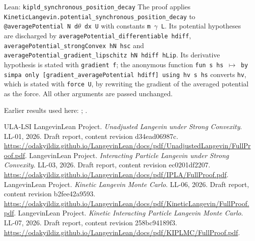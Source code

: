 \documentclass[11pt,a4paper]{article}
\begin{document}
\begin{leanbox}{Lean: \texttt{kipld\_\allowbreak{}synchronous\_\allowbreak{}position\_\allowbreak{}decay}}
The proof applies \texttt{Kinetic\allowbreak{}Langevin.\allowbreak{}potential\_\allowbreak{}synchronous\_\allowbreak{}position\_\allowbreak{}decay} to \texttt{@average\allowbreak{}Potential N d\ensuremath{\theta} dx U} with constants \texttt{m \ensuremath{\gamma} L}. Its potential hypotheses are discharged by \texttt{average\allowbreak{}Potential\_\allowbreak{}differentiable hdiff}, \texttt{average\allowbreak{}Potential\_\allowbreak{}strong\allowbreak{}Convex h\allowbreak{}N hsc} and \texttt{average\allowbreak{}Potential\_\allowbreak{}gradient\_\allowbreak{}lipschitz h\allowbreak{}N hdiff h\allowbreak{}Lip}. Its derivative hypothesis is stated with \texttt{gradient f}; the anonymous function \texttt{fun s hs \ensuremath{\mapsto} by simpa only [gradient\_\allowbreak{}average\allowbreak{}Potential hdiff] using hv s hs} converts \texttt{hv}, which is stated with \texttt{force U}, by rewriting the gradient of the averaged potential as the force. All other arguments are passed unchanged.
\end{leanbox}


Earlier results used here: \cite[Section~3.1.1]{LangevinLean2026IPLA}; \cite[Section~3.6.5]{LangevinLean2026Kinetic}.

\begin{thebibliography}{ULA-LSI}
LangevinLean Project. \emph{Unadjusted Langevin under Strong Convexity}. LL-01, 2026. Draft report, content revision d34ead06987c. \url{https://odakyildiz.github.io/LangevinLean/docs/pdf/UnadjustedLangevin/FullProof.pdf}.
LangevinLean Project. \emph{Interacting Particle Langevin under Strong Convexity}. LL-03, 2026. Draft report, content revision ec0201df2207. \url{https://odakyildiz.github.io/LangevinLean/docs/pdf/IPLA/FullProof.pdf}.
LangevinLean Project. \emph{Kinetic Langevin Monte Carlo}. LL-06, 2026. Draft report, content revision b2fee42a9593. \url{https://odakyildiz.github.io/LangevinLean/docs/pdf/KineticLangevin/FullProof.pdf}.
LangevinLean Project. \emph{Kinetic Interacting Particle Langevin Monte Carlo}. LL-07, 2026. Draft report, content revision 258bc94189f3. \url{https://odakyildiz.github.io/LangevinLean/docs/pdf/KIPLMC/FullProof.pdf}.
\end{thebibliography}
\end{document}
